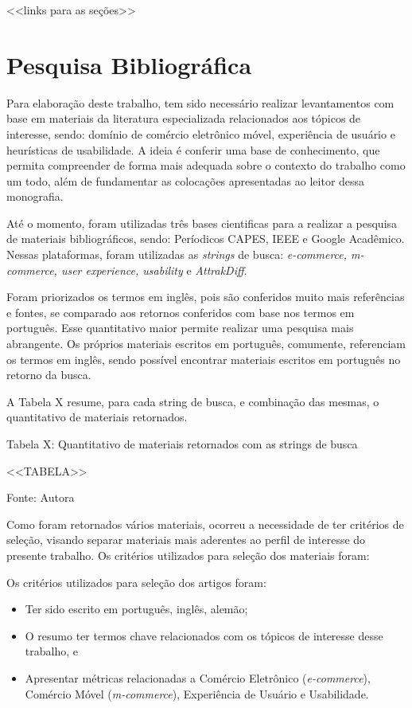 <<links para as seções>>

\section{Pesquisa Bibliográfica}

Para elaboração deste trabalho, tem sido necessário realizar levantamentos com base em materiais da literatura especializada relacionados aos tópicos de interesse, sendo: domínio de comércio eletrônico móvel, experiência de usuário e heurísticas de usabilidade. A ideia é conferir uma base de conhecimento, que permita compreender de forma mais adequada sobre o contexto do trabalho como um todo, além de fundamentar as colocações apresentadas ao leitor dessa monografia.

Até o momento, foram utilizadas três bases cientificas para a realizar a pesquisa de materiais bibliográficos, sendo: Períodicos CAPES, IEEE e Google Acadêmico. Nessas plataformas, foram utilizadas as \textit{strings} de busca: \textit{e-commerce, m-commerce, user experience, usability} e \textit{AttrakDiff}.


Foram priorizados os termos em inglês, pois são conferidos muito mais referências e fontes, se comparado aos retornos conferidos com base nos termos em português. Esse quantitativo maior permite realizar uma pesquisa mais abrangente. Os próprios materiais escritos em português, comumente, referenciam os termos em inglês, sendo possível encontrar materiais escritos em português no retorno da busca.

A Tabela X resume, para cada string de busca, e combinação das mesmas, o quantitativo de materiais retornados.

Tabela X: Quantitativo de materiais retornados com as strings de busca

<<TABELA>>

Fonte: Autora

Como foram retornados vários materiais, ocorreu a necessidade de ter critérios de seleção, visando separar materiais mais aderentes ao perfil de interesse do presente trabalho. Os critérios utilizados para seleção dos materiais foram:

Os critérios utilizados para seleção dos artigos foram:

\begin{itemize}
    \item Ter sido escrito em português, inglês, alemão;
    \item O resumo ter termos chave relacionados com os tópicos de interesse desse trabalho, e
    \item Apresentar métricas relacionadas a Comércio Eletrônico (\textit{e-commerce}), Comércio Móvel (\textit{m-commerce}), Experiência de Usuário e Usabilidade.
\end{itemize}

